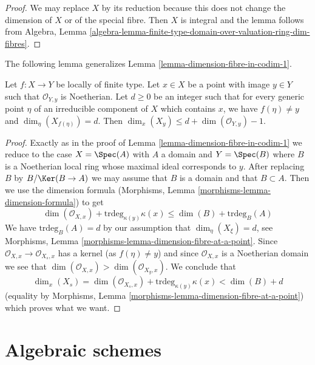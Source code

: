\begin{proof}
We may replace $X$ by its reduction because this does not change the
dimension of $X$ or of the special fibre. Then $X$ is integral and
the lemma follows from Algebra, Lemma
\ref{algebra-lemma-finite-type-domain-over-valuation-ring-dim-fibres}.
\end{proof}

\noindent
The following lemma generalizes Lemma \ref{lemma-dimension-fibre-in-codim-1}.

\begin{lemma}
\label{lemma-dimension-fibre-in-higher-codimension}
Let $f : X \to Y$ be locally of finite type. Let $x \in X$ be a point
with image $y \in Y$ such that $\mathcal{O}_{Y, y}$ is Noetherian. Let
$d \geq 0$ be an integer such that for every generic point $\eta$ of an
irreducible component of $X$ which contains $x$, we have
$f(\eta) \not = y$ and $\dim_\eta(X_{f(\eta)}) = d$. Then
$\dim_x(X_y) \leq d + \dim(\mathcal{O}_{Y, y}) - 1$.
\end{lemma}

\begin{proof}
Exactly as in the proof of Lemma \ref{lemma-dimension-fibre-in-codim-1}
we reduce to the case $X = \Spec(A)$ with $A$ a domain and $Y = \Spec(B)$
where $B$ is a Noetherian local ring whose maximal ideal corresponds to $y$.
After replacing $B$ by $B/\Ker(B \to A)$ we may assume that $B$
is a domain and that $B \subset A$.
Then we use the dimension formula
(Morphisms, Lemma \ref{morphisms-lemma-dimension-formula}) to get
$$
\dim(\mathcal{O}_{X, x}) + \text{trdeg}_{\kappa(y)} \kappa(x) \leq
\dim(B) + \text{trdeg}_B(A)
$$
We have $\text{trdeg}_B(A) = d$ by
our assumption that $\dim_\eta(X_\xi) = d$, see
Morphisms, Lemma \ref{morphisms-lemma-dimension-fibre-at-a-point}.
Since $\mathcal{O}_{X, x} \to \mathcal{O}_{X_s, x}$ has a kernel
(as $f(\eta) \not = y$) and since $\mathcal{O}_{X, x}$
is a Noetherian domain we see that
$\dim(\mathcal{O}_{X, x}) > \dim(\mathcal{O}_{X_y, x})$.
We conclude that
$$
\dim_x(X_s) =
\dim(\mathcal{O}_{X_s, x}) + \text{trdeg}_{\kappa(y)} \kappa(x)
< \dim(B) + d
$$
(equality by Morphisms, Lemma \ref{morphisms-lemma-dimension-fibre-at-a-point})
which proves what we want.
\end{proof}




\section{Algebraic schemes}
\label{section-algebraic-schemes}

